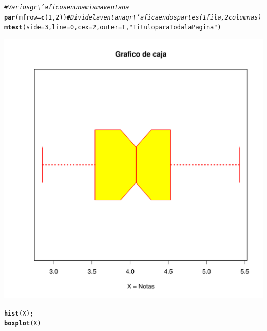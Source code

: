 \documentclass[12pt,letterpaper]{article}\usepackage[]{graphicx}\usepackage[]{color}
\makeatletter
\def\maxwidth{ %
  \ifdim\Gin@nat@width>\linewidth
    \linewidth
  \else
    \Gin@nat@width
  \fi
}
\newcommand{\hlnum}[1]{\textcolor[rgb]{0.686,0.059,0.569}{#1}}%
\newcommand{\hlstr}[1]{\textcolor[rgb]{0.192,0.494,0.8}{#1}}%
\newcommand{\hlcom}[1]{\textcolor[rgb]{0.678,0.584,0.686}{\textit{#1}}}%
\newcommand{\hlstd}[1]{\textcolor[rgb]{0.345,0.345,0.345}{#1}}%
\newcommand{\hlkwc}[1]{\textcolor[rgb]{0.333,0.667,0.333}{#1}}%
\newcommand{\hlkwd}[1]{\textcolor[rgb]{0.737,0.353,0.396}{\textbf{#1}}}%
\newenvironment{kframe}{%
 \def\at@end@of@kframe{}%
 \ifinner\ifhmode%
  \def\at@end@of@kframe{\end{minipage}}%
  \begin{minipage}{\columnwidth}%
 \fi\fi%
 \def\FrameCommand##1{\hskip\@totalleftmargin \hskip-\fboxsep
 \colorbox{shadecolor}{##1}\hskip-\fboxsep
     \hskip-\linewidth \hskip-\@totalleftmargin \hskip\columnwidth}%
 \MakeFramed {\advance\hsize-\width
   \@totalleftmargin\z@ \linewidth\hsize
   \@setminipage}}%
 {\par\unskip\endMakeFramed%
 \at@end@of@kframe}
\newenvironment{knitrout}{}{} %
\makeatother
\begin{document}
\begin{knitrout}
\begin{kframe}
\begin{alltt}
\hlcom{# Varios gr\textbackslash{}'aficos en una misma ventana}
\hlkwd{par}\hlstd{(}\hlkwc{mfrow}\hlstd{=}\hlkwd{c}\hlstd{(}\hlnum{1}\hlstd{,}\hlnum{2}\hlstd{))} \hlcom{# Divide la ventana gr\textbackslash{}'afica en dos partes (1 fila, 2 columnas)}
\hlkwd{mtext}\hlstd{(}\hlkwc{side}\hlstd{=}\hlnum{3}\hlstd{,} \hlkwc{line}\hlstd{=}\hlnum{0}\hlstd{,} \hlkwc{cex}\hlstd{=}\hlnum{2}\hlstd{,} \hlkwc{outer}\hlstd{=T,} \hlstr{"Titulo para Toda la Pagina"}\hlstd{)}
\end{alltt}
\end{kframe}
\includegraphics[width=\maxwidth]{figure/unnamed-chunk-12-2} 
\begin{kframe}\begin{alltt}
\hlkwd{hist}\hlstd{(X);}
\hlkwd{boxplot}\hlstd{(X)}
\end{alltt}
\end{kframe}

\end{knitrout}
\end{document}
